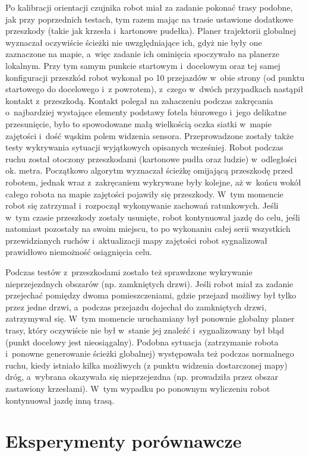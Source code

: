 Po kalibracji orientacji czujnika robot miał za zadanie pokonać trasy podobne,
jak przy poprzednich testach, tym razem mając na trasie ustawione dodatkowe
przeszkody (takie jak krzesła i~kartonowe pudełka). Planer trajektorii 
globalnej wyznaczał oczywiście ścieżki nie uwzględniające ich, gdyż nie 
były one zaznaczone na mapie, a~więc zadanie ich ominięcia spoczywało na
planerze lokalnym. Przy tym samym punkcie startowym i~docelowym oraz tej 
samej konfiguracji przeszkód robot wykonał po 10 przejazdów w~obie strony 
(od punktu startowego do docelowego i~z powrotem), z~czego w~dwóch przypadkach 
nastąpił kontakt z~przeszkodą. Kontakt polegał na zahaczeniu podczas zakręcania
o~najbardziej wystające elementy podstawy fotela biurowego i~jego delikatne 
przesunięcie, było to spowodowane małą wielkością oczka siatki w~mapie zajętości
i~dość wąskim polem widzenia sensora. Przeprowadzone zostały także testy 
wykrywania sytuacji wyjątkowych opisanych wcześniej. Robot podczas ruchu 
został otoczony przeszkodami (kartonowe pudła oraz ludzie) w~odległości 
ok. metra. Początkowo algorytm wyznaczał ścieżkę omijającą przeszkodę przed 
robotem, jednak wraz z~zakręcaniem wykrywane były kolejne, aż w~końcu wokół
całego robota na mapie zajętości pojawiły się przeszkody. W~tym momencie 
robot się zatrzymał i~rozpoczął wykonywanie zachowań ratunkowych. Jeśli 
w~tym czasie przeszkody zostały usunięte, robot kontynuował jazdę do celu,
jeśli natomiast pozostały na swoim miejscu, to po wykonaniu całej serii 
wszystkich przewidzianych ruchów i~aktualizacji mapy zajętości robot sygnalizował
prawidłowo niemożność osiągnięcia celu. 

Podczas testów z~przeszkodami zostało też sprawdzone wykrywanie nieprzejezdnych
obszarów (np. zamkniętych drzwi). Jeśli robot miał za zadanie przejechać pomiędzy
dwoma pomieszczeniami, gdzie przejazd możliwy był tylko przez jedne drzwi,
a~podczas przejazdu dojechał do zamkniętych drzwi, zatrzymywał się. W~tym 
momencie uruchamiany był ponownie globalny planer trasy, który oczywiście
nie był w~stanie jej znaleźć i~sygnalizowany był błąd (punkt docelowy jest
nieosiągalny). Podobna sytuacja (zatrzymanie robota i~ponowne generowanie 
ścieżki globalnej) występowała też podczas normalnego ruchu, kiedy istniało
kilka możliwych (z punktu widzenia dostarczonej mapy) dróg, a~wybrana okazywała
się nieprzejezdna (np. prowadziła przez obszar zastawiony krzesłami). W~tym 
wypadku po ponownym wyliczeniu robot kontynuował jazdę inną trasą.

\section{Eksperymenty porównawcze}

